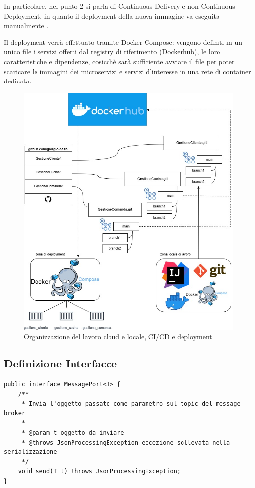 In particolare, nel punto 2 si parla di Continuous Delivery e non Continuous Deployment, in quanto il deployment della nuova immagine va eseguita manualmente \cite{CDDocker}.

Il deployment verrà effettuato tramite Docker Compose: vengono definiti in un unico file i servizi offerti dal registry di riferimento (Dockerhub), le loro caratteristiche e dipendenze, cosicchè sarà sufficiente avviare il file per poter scaricare le immagini dei microservizi e servizi d’interesse in una rete di container dedicata.



\begin{figure}[htbp]
	\centering
	\includegraphics[scale=0.36]{iterazione1/images/DevOps.jpg}
	\caption{Organizzazione del lavoro cloud e locale, CI/CD e deployment 
 \label{fig:devopsit1}}
\end{figure}




\subsection{Definizione Interfacce}
\begin{lstlisting}[style=myJava, 
    caption={Interfaccia MessagePort}, label=lst:messageport,]
public interface MessagePort<T> {
    /**
     * Invia l'oggetto passato come parametro sul topic del message broker
     *
     * @param t oggetto da inviare
     * @throws JsonProcessingException eccezione sollevata nella serializzazione
     */
    void send(T t) throws JsonProcessingException;
}
\end{lstlisting}

